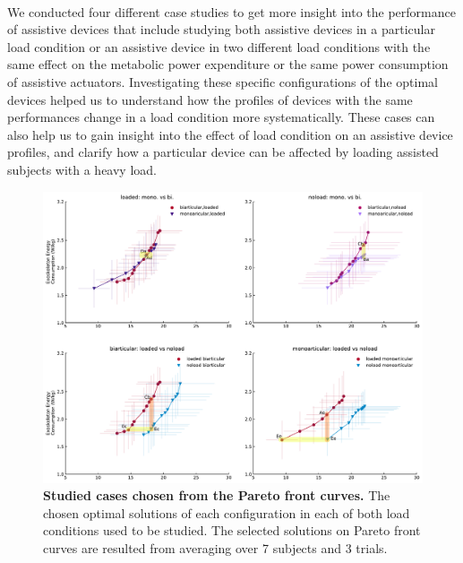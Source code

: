 \documentclass[10pt,letterpaper]{article}
\begin{document}
\vspace*{0.2in}
	
{\Large\textbf{} %
}
\\
\vspace{5 mm}
We conducted four different case studies to get more insight into the performance of assistive devices that include studying both assistive devices in a particular load condition or an assistive device in two different load conditions with the same effect on the metabolic power expenditure or the same power consumption of assistive actuators. Investigating these specific configurations of the optimal devices helped us to understand how the profiles of devices with the same performances change in a load condition more systematically. These cases can also help us to gain insight into the effect of load condition on an assistive device profiles, and clarify how a particular device can be affected by loading assisted subjects with a heavy load.
\begin{figure}[!ht]   
	\centering
	\includegraphics[width=\linewidth]{Case_Studies/PaperFigure_Selected_Configurations.pdf}
	\vspace{1mm}
	\caption{{\small\textbf{Studied cases chosen from the Pareto front curves.} The chosen optimal solutions of each configuration in each of both load conditions used to be studied. The selected solutions on Pareto front curves are resulted from averaging over 7 subjects and 3 trials.}}
	\label{Fig_Selected_OptimalDevices_On_Pareto}
\end{figure}
\end{document}
